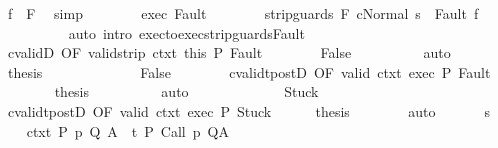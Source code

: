 \begin{isabellebody}
\ {\isachardoublequoteopen}f\ {\isasymnotin}\ {\isacharminus}F{\isachardoublequoteclose}\ \isamarkupfalse%
\ simp\isanewline
\ \ \ \ \ \ \isamarkupfalse%
\ exec\ Fault\isanewline
\ \ \ \ \ \ \isamarkupfalse%
\ {\isachardoublequoteopen}{\isasymGamma}{\isasymturnstile}{\isasymlangle}strip{\isacharunderscore}guards\ {\isacharparenleft}{\isacharminus}F{\isacharparenright}\ c{\isacharcomma}Normal\ s{\isasymrangle}\ {\isasymRightarrow}\ Fault\ f{\isachardoublequoteclose}\ \isanewline
\ \ \ \ \ \ \ \ \isamarkupfalse%
\ {\isacharparenleft}auto\ intro{\isacharcolon}\ exec{\isacharunderscore}to{\isacharunderscore}exec{\isacharunderscore}strip{\isacharunderscore}guards{\isacharunderscore}Fault{\isacharparenright}\isanewline
\ \ \ \ \ \ \isamarkupfalse%
\ cvalidD\ {\isacharbrackleft}OF\ valid{\isacharunderscore}strip\ ctxt{\isacharprime}\ this\ P{\isacharbrackright}\ Fault\isanewline
\ \ \ \ \ \ \isamarkupfalse%
\ False\isanewline
\ \ \ \ \ \ \ \ \isamarkupfalse%
\ auto\isanewline
\ \ \ \ \ \ \isamarkupfalse%
\ {\isacharquery}thesis\ \isacommand{{\isachardot}{\isachardot}}\isamarkupfalse%
\isanewline
\ \ \ \ \isamarkupfalse%
\isanewline
\ \ \ \ \ \ \isamarkupfalse%
\ False\isanewline
\ \ \ \ \ \ \isamarkupfalse%
\ cvalidt{\isacharunderscore}postD\ {\isacharbrackleft}OF\ valid\ ctxt{\isacharprime}{\isacharprime}\ exec\ P{\isacharbrackright}\ Fault\isanewline
\ \ \ \ \ \ \isamarkupfalse%
\ {\isacharquery}thesis\isanewline
\ \ \ \ \ \ \ \ \isamarkupfalse%
\ auto\isanewline
\ \ \ \ \isamarkupfalse%
\isanewline
\ \ \isamarkupfalse%
\isanewline
\ \ \ \ \isamarkupfalse%
\ Stuck\isanewline
\ \ \ \ \isamarkupfalse%
\ cvalidt{\isacharunderscore}postD\ {\isacharbrackleft}OF\ valid\ ctxt{\isacharprime}{\isacharprime}\ exec\ P{\isacharbrackright}\ Stuck\isanewline
\ \ \ \ \isamarkupfalse%
\ {\isacharquery}thesis\isanewline
\ \ \ \ \ \ \isamarkupfalse%
\ auto\isanewline
\ \ \isamarkupfalse%
\isanewline
{}\isamarkupfalse%
\isanewline
\ \ \isamarkupfalse%
\ s\isanewline
\ \ \isamarkupfalse%
\ ctxt{\isacharcolon}\ {\isachardoublequoteopen}{\isasymforall}{\isacharparenleft}P{\isacharcomma}\ p{\isacharcomma}\ Q{\isacharcomma}\ A{\isacharparenright}{\isasymin}{\isasymTheta}{\isachardot}\ {\isasymGamma}\ {\isasymTurnstile}\isactrlsub t\isactrlbsub {\isacharslash}{\isacharbraceleft}{\isacharbraceright}\isactrlesub \ P\ {\isacharparenleft}Call\ p{\isacharparenright}\ Q{\isacharcomma}A{\isachardoublequoteclose}\isanewline

\end{isabellebody}
